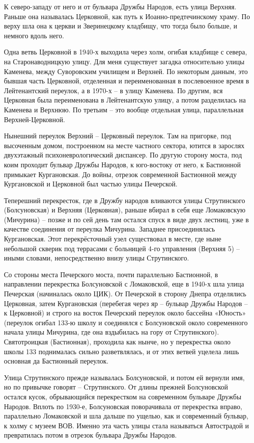 К северо-западу от него и от бульвара Дружбы Народов, есть улица Верхняя. Раньше она называлась Церковной, как путь к Иоанно-предтечинскому храму. По верху шла она к церкви и Зверинецкому кладбищу, что тогда было больше, и немного вдоль него.

Одна ветвь Церковной в 1940-х выходила через холм, огибая кладбище с севера, на Старонаводницкую улицу. Для меня существует загадка относительно улицы Каменева, между Суворовским училищем и Верхней. По некоторым данным, это бывшая часть Церковной, отделенная и переименованная в послевоенное время в Лейтенантский переулок, а в 1970-х – в улицу Каменева. По другим, вся Церковная была переименована в Лейтенантскую улицу, а потом разделилась на Каменева и Верхнюю. По третьим – это вообще отдельная улица, параллельная Верхней-Церковной.

Нынешний переулок Верхний – Церковный переулок. Там на пригорке, под высоченным домом, построенном на месте частного сектора, ютится в зарослях двухэтажный психоневрологический диспансер. По другую сторону моста, под коим проходит бульвар Дружбы Народов, к юго-востоку от него, к Бастионной примыкает Кургановская. До войны, отрезок современной Бастионной между Кургановской и Церковной был частью улицы Печерской.

Теперешний перекресток, где в Дружбу народов вливаются улицы Струтинского (Болсуновская) и Верхняя (Церковная), раньше вбирал в себя еще Ломаковскую (Мичурина) – позже и по сей день там остался спуск в виде двух лестниц, уже в качестве соединения от переулка Мичурина. Западнее присоединялась Кургановская. Этот перекрёсточный узел существовал в месте, где ныне небольшой скверик под террасами с больницей 4-го управления (Верхняя 5) – иными словами, непосредственно внизу улицы Струтинского.

Со стороны места Печерского моста, почти параллельно Бастионной, в направлении перекрестка Болсуновской с Ломаковской,  
еще в 1940-х шла улица Печерская (начиналась около ЦИК). От Печерской в сторону Днепра отделялись Церковная, затем Кургановская (перебегая через яр – бульвар Дружбы Народов – к Церковной) и строго на восток Печерский переулок около бассейна «Юность» (переулок огибал 133-ю школу и соединялся с Болсуновской около современного начала улицы Мичурина, где она вздыбилась на гору от Струтинского). Святотроицкая (Бастионная), проходила как нынче, но у перекрестка около школы 133 поднималась сильно разветвлялась, и от этих ветвей уцелела лишь основная да Бастионный переулок.

Улица Струтинского прежде называлась Болсуновской, и потом ей вернули имя, но по привычке говорят – Струтинского. От длины прежней Болсуновской остался кусок, обрывающийся перекрестком на современном бульваре Дружбы Народов. Вплоть по 1930-е, Болсуновская поворачивала от перекрестка вправо, параллельно Ломаковской и шла дальше по ущелью, как и современный бульвар, к холму с музеем ВОВ. Именно эта часть улицы стала называться Автострадой и превратилась потом в отрезок бульвара Дружбы Народов.

